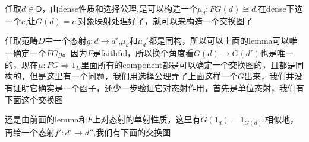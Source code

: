 \documentclass{article}
\newcommand*{\cat}[1]{\textsf{#1}\xspace}
\newcommand{\To}{\Rightarrow}
\newcommand*{\xfunc}[4]{{#2}\colon{#3}{#1}{#4}}
\newcommand*{\func}[3]{\xfunc{\to}{#1}{#2}{#3}}
\newcommand*{\Func}[3]{\xfunc{\To}{#1}{#2}{#3}}
\newcommand*{\isom}[3]{\xfunc{\cong}{#1}{#2}{#3}}
\begin{document}
任取$d \in \cat{D}$，由dense性质和选择公理,是可以构造一个$\isom{\mu_d}{FG(d)}{d}$,在dense下选一个$c$,让$G(d)=c$.对象映射处理好了，就可以来构造一个交换图了
		
\begin{center}		
\end{center}

任取范畴$D$中一个态射$\func{g}{d}{d'}$,$\mu_d$和$\mu_d'$都是同构，所以可以上面的lemma可以唯一确定一个$FGg$。因为$F$是faithful，所以换个角度看$G(d) \rightarrow G(d')$也是唯一的，现在$\Func{\mu}{FG}{1_D}$里面所有的component都是可以确定一个交换图的，且都是同构的，但是这里有一个问题，我们用选择公理弄了上面这样一个$G$出来，我们并没有证明它确实是一个函子，还少一步验证它对态射作用，首先是单位态射，我们有下面这个交换图
\begin{center}
\end{center}

还是由前面的lemma和$F$上对态射的单射性质，这里有$G(1_d) = 1_{G(d)}$,相似地，再给一个态射$\func{f'}{d'}{d''}$,我们有下面的交换图
\end{document}
